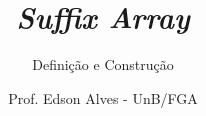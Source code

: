 \title{\it Suffix Array}
\subtitle{Definição e Construção}
\author{Prof. Edson Alves - UnB/FGA}
\date{}
